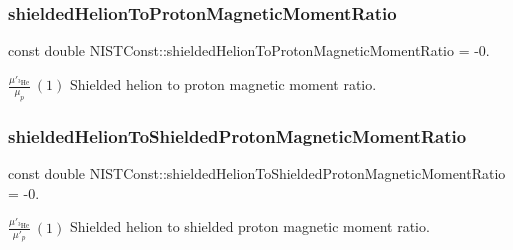 \subsubsection{\texorpdfstring{shielded\+Helion\+To\+Proton\+Magnetic\+Moment\+Ratio}{shieldedHelionToProtonMagneticMomentRatio}}
{\footnotesize\ttfamily const double N\+I\+S\+T\+Const\+::shielded\+Helion\+To\+Proton\+Magnetic\+Moment\+Ratio = -\/0.}

$\frac{\mu'_{^3\textrm{He}}}{\mu_p} \ (1)$ Shielded helion to proton magnetic moment ratio. \mbox{\label{group___helion_ga3b8301672e9de426ef6bf13276b42acc}} 
\subsubsection{\texorpdfstring{shielded\+Helion\+To\+Shielded\+Proton\+Magnetic\+Moment\+Ratio}{shieldedHelionToShieldedProtonMagneticMomentRatio}}
{\footnotesize\ttfamily const double N\+I\+S\+T\+Const\+::shielded\+Helion\+To\+Shielded\+Proton\+Magnetic\+Moment\+Ratio = -\/0.}

$\frac{\mu'_{^3\textrm{He}}}{\mu'_p} \ (1)$ Shielded helion to shielded proton magnetic moment ratio. 